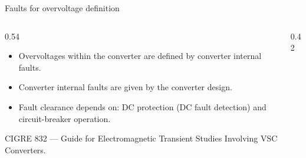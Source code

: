 \begin{frame}{Faults for overvoltage definition}
  \begin{columns}[c,onlytextwidth]
    \begin{column}{0.54\textwidth}
      \begin{itemize}
        \setlength{\itemsep}{0.45em}
        \item Overvoltages within the converter are defined by converter
              internal faults.
        \item Converter internal faults are given by the converter design.
        \item Fault clearance depends on: DC protection (DC fault detection)
              and circuit-breaker operation.
      \end{itemize}
      \vspace{0.3em}
      {\color{atGray}\footnotesize CIGRE 832 --- Guide for Electromagnetic
      Transient Studies Involving VSC Converters.}
    \end{column}
    \begin{column}{0.42\textwidth}
      \centering
    \end{column}
  \end{columns}
\end{frame}
